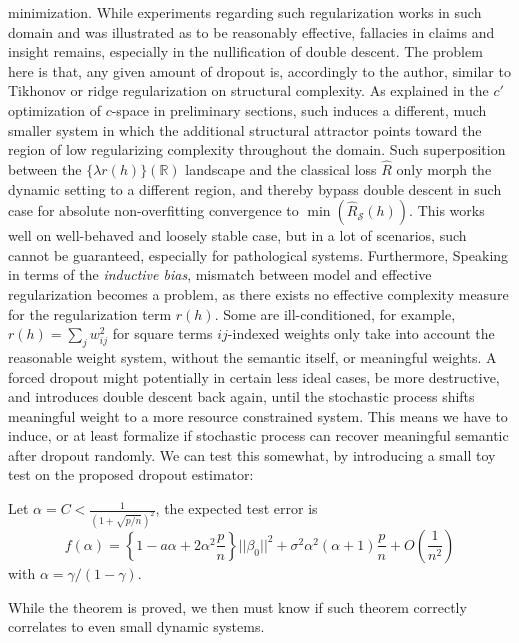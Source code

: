 \documentclass[
  journal=largetwo,
  year=2025,
  volume=37,
]{cup-journal}
\begin{document}
minimization. While experiments regarding such regularization works in such domain and was illustrated as to be reasonably effective, fallacies in claims and insight remains, especially in the nullification of double descent. The problem here is that, any given amount of dropout is, accordingly to the author, similar to Tikhonov or ridge regularization on structural complexity. As explained in the $c'$ optimization of $c$-space in preliminary sections, such induces a different, much smaller system in which the additional structural attractor points toward the region of low regularizing complexity throughout the domain. Such superposition between the $\{\lambda r(h)\}(\mathbb{R})$ landscape and the classical loss $\hat{R}$ only morph the dynamic setting to a different region, and thereby bypass double descent in such case for absolute non-overfitting convergence to $\min{(\hat{R}_{\mathcal{S}}(h))}$. This works well on well-behaved and loosely stable case, but in a lot of scenarios, such cannot be guaranteed, especially for pathological systems. Furthermore, Speaking in terms of the \textit{inductive bias}, mismatch between model and effective regularization becomes a problem, as there exists no effective complexity measure for the regularization term $r(h)$. Some are ill-conditioned, for example, $r(h)=\sum_{j}w_{ij}^{2}$ for square terms $ij$-indexed weights only take into account the reasonable weight system, without the semantic itself, or meaningful weights. A forced dropout might potentially in certain less ideal cases, be more destructive, and introduces double descent back again, until the stochastic process shifts meaningful weight to a more resource constrained system. This means we have to induce, or at least formalize if stochastic process can recover meaningful semantic after dropout randomly. We can test this somewhat, by introducing a small toy test on the proposed dropout estimator: 
\begin{theorem}
    Let $\alpha = C< \frac{1}{(1+\sqrt{p/n})^2}$, the expected test error is \begin{equation}
        f(\alpha) = \left\{ 1- a\alpha + 2\alpha^2 \frac{p}{n} \right\} ||\beta_{0}||^2 + \sigma^2 \alpha^2 (\alpha + 1)\frac{p}{n} + O\left(\frac{1}{n^2}\right)
    \end{equation}
    with $\alpha=\gamma/(1-\gamma)$.
\end{theorem}
While the theorem is proved, we then must know if such theorem correctly correlates to even small dynamic systems.
\end{document}
